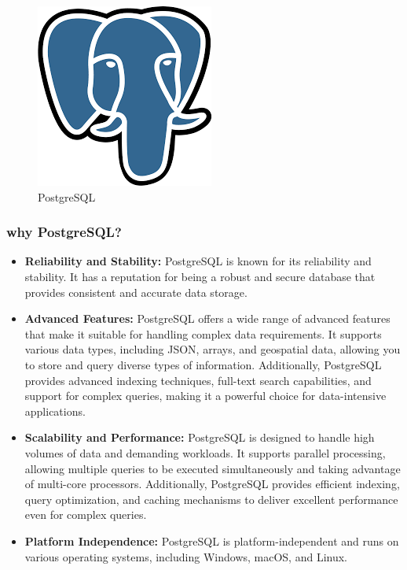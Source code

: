 \documentclass[
12pt,
oneside, 
onehalfspacing, 
nolistspacing, 
parskip, 
chapterinoneline, 
]{AASTCOMPUTER}
\begin{document}
\begin{figure}[!ht]
	\centering
	\includegraphics[scale=0.5]{Figures/database/postgreSQL.png}
  	\caption{PostgreSQL}
  	\label{fig:PostgreSQL}
\end{figure}

\subsubsection{why PostgreSQL?}

\begin{itemize}
\item \textbf{Reliability and Stability:} PostgreSQL is known for its reliability and stability. It has a reputation for being a robust and secure database that provides consistent and accurate data storage.

\item \textbf{Advanced Features:} PostgreSQL offers a wide range of advanced features that make it suitable for handling complex data requirements. It supports various data types, including JSON, arrays, and geospatial data, allowing you to store and query diverse types of information. Additionally, PostgreSQL provides advanced indexing techniques, full-text search capabilities, and support for complex queries, making it a powerful choice for data-intensive applications.

\item \textbf{Scalability and Performance:} PostgreSQL is designed to handle high volumes of data and demanding workloads. It supports parallel processing, allowing multiple queries to be executed simultaneously and taking advantage of multi-core processors. Additionally, PostgreSQL provides efficient indexing, query optimization, and caching mechanisms to deliver excellent performance even for complex queries.

\item \textbf{Platform Independence:} PostgreSQL is platform-independent and runs on various operating systems, including Windows, macOS, and Linux.
\end{itemize}
\end{document}

